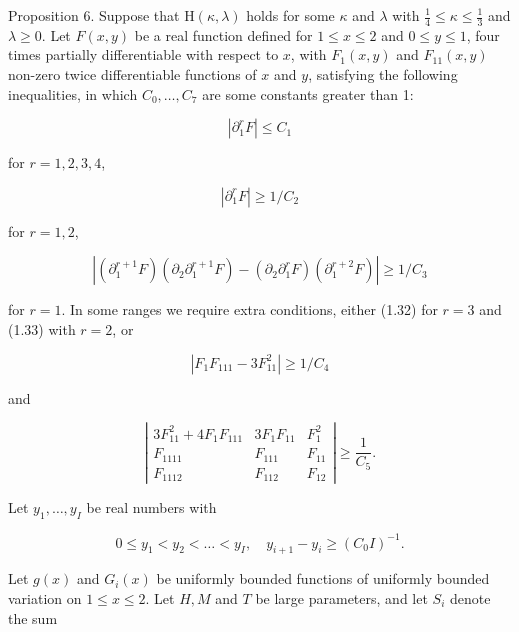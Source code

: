 \documentclass[10pt]{article}
\begin{document}
Proposition 6. Suppose that $\mathrm{H}(\kappa, \lambda)$ holds for some $\kappa$ and $\lambda$ with $\frac{1}{4} \leqslant \kappa \leqslant \frac{1}{3}$ and $\lambda \geqslant 0$. Let $F(x, y)$ be a real function defined for $1 \leqslant x \leqslant 2$ and $0 \leqslant y \leqslant 1$, four times partially differentiable with respect to $x$, with $F_{1}(x, y)$ and $F_{11}(x, y)$ non-zero twice differentiable functions of $x$ and $y$, satisfying the following inequalities, in which $C_{0}, \ldots, C_{7}$ are some constants greater than 1:

$$
\left|\partial_{1}^{r} F\right| \leqslant C_{1}
$$

for $r=1,2,3,4$,


\begin{equation*}
\left|\partial_{1}^{r} F\right| \geqslant 1 / C_{2} \tag{1.32}
\end{equation*}


for $r=1,2$,


\begin{equation*}
\left|\left(\partial_{1}^{r+1} F\right)\left(\partial_{2} \partial_{1}^{r+1} F\right)-\left(\partial_{2} \partial_{1}^{r} F\right)\left(\partial_{1}^{r+2} F\right)\right| \geqslant 1 / C_{3} \tag{1.33}
\end{equation*}


for $r=1$. In some ranges we require extra conditions, either (1.32) for $r=3$ and (1.33) with $r=2$, or


\begin{equation*}
\left|F_{1} F_{111}-3 F_{11}^{2}\right| \geqslant 1 / C_{4} \tag{1.34}
\end{equation*}


and

\begin{equation*}
\left|
\begin{array}{ccc}
3 F_{11}^{2}+4 F_{1} F_{111} & 3 F_{1} F_{11} & F_{1}^{2} \\
F_{1111} & F_{111} & F_{11} \\
F_{1112} & F_{112} & F_{12}
\end{array}
\right| \geqslant \frac{1}{C_{5}}. \tag{1.35}
\end{equation*}

Let $y_{1}, \ldots, y_{I}$ be real numbers with

$$
0 \leqslant y_{1}<y_{2}<\ldots<y_{I}, \quad y_{i+1}-y_{i} \geqslant\left(C_{0} I\right)^{-1}.
$$

Let $g(x)$ and $G_{i}(x)$ be uniformly bounded functions of uniformly bounded variation on $1 \leqslant x \leqslant 2$. Let $H, M$ and $T$ be large parameters, and let $S_{i}$ denote the sum
\end{document}
